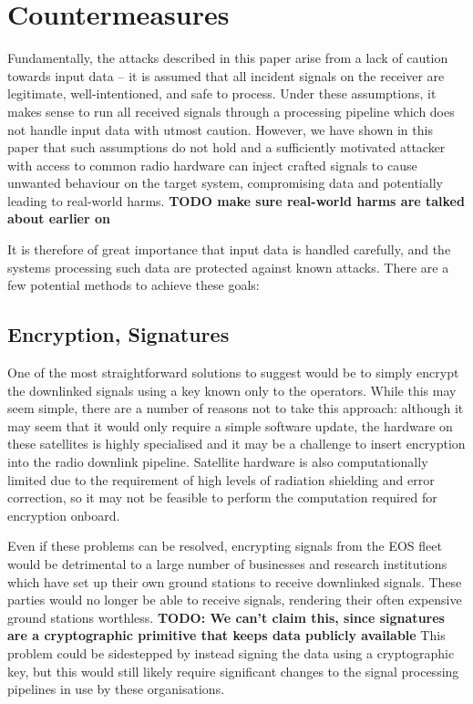 \section{Countermeasures}

Fundamentally, the attacks described in this paper arise from a lack of caution towards input data -- it is assumed that all incident signals on the receiver are legitimate, well-intentioned, and safe to process.
Under these assumptions, it makes sense to run all received signals through a processing pipeline which does not handle input data with utmost caution.
However, we have shown in this paper that such assumptions do not hold and a sufficiently motivated attacker with access to common radio hardware can inject crafted signals to cause unwanted behaviour on the target system, compromising data and potentially leading to real-world harms.
\textbf{TODO make sure real-world harms are talked about earlier on}

It is therefore of great importance that input data is handled carefully, and the systems processing such data are protected against known attacks.
There are a few potential methods to achieve these goals:

\subsection{Encryption, Signatures}

One of the most straightforward solutions to suggest would be to simply encrypt the downlinked signals using a key known only to the operators.
While this may seem simple, there are a number of reasons not to take this approach: although it may seem that it would only require a simple software update, the hardware on these satellites is highly specialised and it may be a challenge to insert encryption into the radio downlink pipeline.
Satellite hardware is also computationally limited due to the requirement of high levels of radiation shielding and error correction, so it may not be feasible to perform the computation required for encryption onboard.

Even if these problems can be resolved, encrypting signals from the EOS fleet would be detrimental to a large number of businesses and research institutions which have set up their own ground stations to receive downlinked signals.
These parties would no longer be able to receive signals, rendering their often expensive ground stations worthless. \textbf{TODO: We can't claim this, since signatures are a cryptographic primitive that keeps data publicly available}
This problem could be sidestepped by instead signing the data using a cryptographic key, but this would still likely require significant changes to the signal processing pipelines in use by these organisations.

